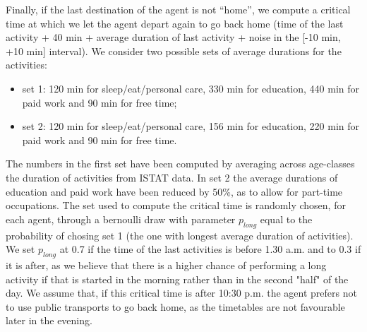 Finally, if the last destination of the agent is not “home”, we compute a critical time at which we let the agent depart again to go back home (time of the last activity + 40 min + average duration of last activity \cite{site11} + noise in the [-10 min, +10 min] interval). We consider two possible sets of average durations for the activities:
\begin{itemize}
\item set 1: 120 min for sleep/eat/personal care, 330 min for education, 440 min for paid work and 90 min for free time;
\item set 2: 120 min for sleep/eat/personal care, 156 min for education, 220 min for paid work and 90 min for free time.
\end{itemize}
The numbers in the first set have been computed by averaging across age-classes the duration of activities from ISTAT data. In set 2 the average durations of education and paid work have been reduced by 50\%, as to allow for part-time occupations. 
The set used to compute the critical time is randomly chosen, for each agent, through a bernoulli draw with parameter $p_{long}$ equal to the probability of chosing set 1 (the one with longest average duration of activities). We set $p_{long}$ at 0.7 if the time of the last activities is before 1.30 a.m. and to 0.3 if it is after, as we believe that there is a higher chance of performing a long activity if that is started in the morning rather than in the second "half" of the day.
We assume that, if this critical time is after 10:30 p.m. the agent prefers not to use public transports to go back home, as the timetables are not favourable later in the evening.
%

